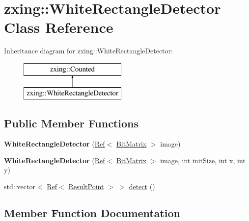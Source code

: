 \hypertarget{classzxing_1_1_white_rectangle_detector}{}\section{zxing\+:\+:White\+Rectangle\+Detector Class Reference}
\label{classzxing_1_1_white_rectangle_detector}
Inheritance diagram for zxing\+:\+:White\+Rectangle\+Detector\+:\begin{figure}[H]
\begin{center}
\leavevmode
\includegraphics[height=2.000000cm]{classzxing_1_1_white_rectangle_detector}
\end{center}
\end{figure}
\subsection*{Public Member Functions}
\begin{DoxyCompactItemize}
\item 
\mbox{\label{classzxing_1_1_white_rectangle_detector_a72dee0f4452e2f2a050d80fb9e25d94e}} 
{\bfseries White\+Rectangle\+Detector} (\mbox{\hyperlink{classzxing_1_1_ref}{Ref}}$<$ \mbox{\hyperlink{classzxing_1_1_bit_matrix}{Bit\+Matrix}} $>$ image)
\item 
\mbox{\label{classzxing_1_1_white_rectangle_detector_a4f87e6c826c4d446dd0dc1d3ae00fd1f}} 
{\bfseries White\+Rectangle\+Detector} (\mbox{\hyperlink{classzxing_1_1_ref}{Ref}}$<$ \mbox{\hyperlink{classzxing_1_1_bit_matrix}{Bit\+Matrix}} $>$ image, int init\+Size, int x, int y)
\item 
std\+::vector$<$ \mbox{\hyperlink{classzxing_1_1_ref}{Ref}}$<$ \mbox{\hyperlink{classzxing_1_1_result_point}{Result\+Point}} $>$ $>$ \mbox{\hyperlink{classzxing_1_1_white_rectangle_detector_a46bc3a8ea25cea0ebd6e7890cedd8146}{detect}} ()
\end{DoxyCompactItemize}


\subsection{Member Function Documentation}
\mbox{\label{classzxing_1_1_white_rectangle_detector_a46bc3a8ea25cea0ebd6e7890cedd8146}} 
